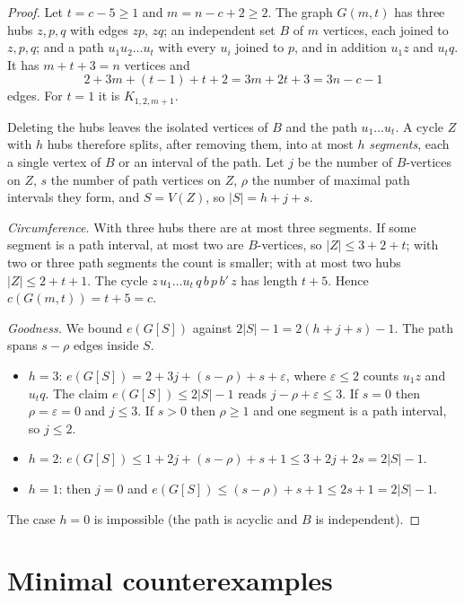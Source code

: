 \documentclass[11pt]{amsart}
\theoremstyle{remark}
\begin{document}
\begin{proof}
Let $t=c-5\ge1$ and $m=n-c+2\ge2$. The graph $G(m,t)$ has three hubs $z,p,q$ with edges $zp$, $zq$; an independent set $B$ of $m$ vertices, each joined to $z,p,q$; and a path $u_1u_2\dots u_t$ with every $u_i$ joined to $p$, and in addition $u_1z$ and $u_tq$. It has $m+t+3=n$ vertices and
\[
2+3m+(t-1)+t+2=3m+2t+3=3n-c-1
\]
edges. For $t=1$ it is $K_{1,2,m+1}$.

Deleting the hubs leaves the isolated vertices of $B$ and the path $u_1\dots u_t$. A cycle $Z$ with $h$ hubs therefore splits, after removing them, into at most $h$ \emph{segments}, each a single vertex of $B$ or an interval of the path. Let $j$ be the number of $B$-vertices on $Z$, $s$ the number of path vertices on $Z$, $\rho$ the number of maximal path intervals they form, and $S=V(Z)$, so $|S|=h+j+s$.

\emph{Circumference.} With three hubs there are at most three segments. If some segment is a path interval, at most two are $B$-vertices, so $|Z|\le 3+2+t$; with two or three path segments the count is smaller; with at most two hubs $|Z|\le 2+t+1$. The cycle $z\,u_1\dots u_t\,q\,b\,p\,b'\,z$ has length $t+5$. Hence $c(G(m,t))=t+5=c$.

\emph{Goodness.} We bound $e(G[S])$ against $2|S|-1=2(h+j+s)-1$. The path spans $s-\rho$ edges inside $S$.
\begin{itemize}
\item $h=3$: $e(G[S])=2+3j+(s-\rho)+s+\varepsilon$, where $\varepsilon\le2$ counts $u_1z$ and $u_tq$. The claim $e(G[S])\le 2|S|-1$ reads $j-\rho+\varepsilon\le3$. If $s=0$ then $\rho=\varepsilon=0$ and $j\le3$. If $s>0$ then $\rho\ge1$ and one segment is a path interval, so $j\le2$.
\item $h=2$: $e(G[S])\le 1+2j+(s-\rho)+s+1\le 3+2j+2s=2|S|-1$.
\item $h=1$: then $j=0$ and $e(G[S])\le (s-\rho)+s+1\le 2s+1=2|S|-1$.
\end{itemize}
The case $h=0$ is impossible (the path is acyclic and $B$ is independent).
\end{proof}

\section{Minimal counterexamples}
\end{document}
